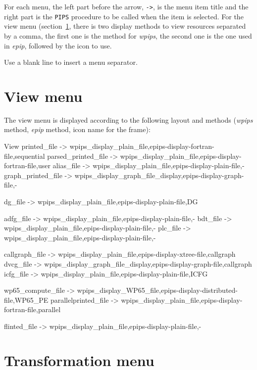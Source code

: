 \documentclass[a4paper]{report}
\newcommand{\Pips}{\texttt{PIPS}}
\newcommand{\EPIPS}{{\em epip}}
\newcommand{\WPIPS}{{\em wpips}}
\begin{document}
For each menu, the left part before the arrow, \verb|->|, is the menu
item title and the right part is the \Pips{} procedure to be called when
the item is selected. For the view menu (section~\ref{sec:view_menu},
there is two display methods to view resources separated by a comma,
the first one is the method for \WPIPS, the second one is the one
used in \EPIPS, followed by the icon to use.

Use a blank line to insert a menu separator.

\section{View menu}
\label{sec:view_menu}

The view menu is displayed according to the following layout and
methods (\WPIPS{} method, \EPIPS{} method, icon name for the frame):
\begin{PipsMenu}{View}
  printed_file -> wpips_display_plain_file,epips-display-fortran-file,sequential
  parsed_printed_file -> wpips_display_plain_file,epips-display-fortran-file,user
  alias_file -> wpips_display_plain_file,epips-display-plain-file,-
  graph_printed_file -> wpips_display_graph_file_display,epips-display-graph-file,-

  dg_file -> wpips_display_plain_file,epips-display-plain-file,DG

  adfg_file -> wpips_display_plain_file,epips-display-plain-file,-
  bdt_file -> wpips_display_plain_file,epips-display-plain-file,-
  plc_file -> wpips_display_plain_file,epips-display-plain-file,-

  callgraph_file -> wpips_display_plain_file,epips-display-xtree-file,callgraph
  dvcg_file -> wpips_display_graph_file_display,epips-display-graph-file,callgraph
  icfg_file -> wpips_display_plain_file,epips-display-plain-file,ICFG

  wp65_compute_file -> wpips_display_WP65_file,epips-display-distributed-file,WP65_PE
  parallelprinted_file -> wpips_display_plain_file,epips-display-fortran-file,parallel

  flinted_file -> wpips_display_plain_file,epips-display-plain-file,-
\end{PipsMenu}


\section{Transformation menu}
\label{sec:transformation_menu}
\end{document}
